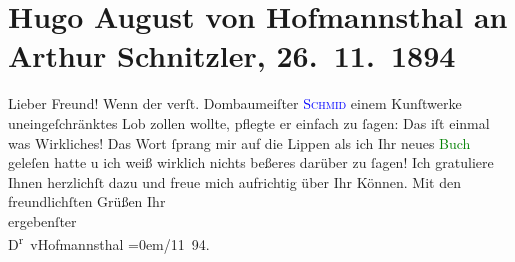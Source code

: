 

               \section[Hugo August von Hofmannsthal an Arthur Schnitzler, 26. 11. 1894]{ Hugo August von Hofmannsthal an Arthur Schnitzler,
                    26. 11. 1894}\nopagebreak{}\rehead{ }\normalsize\beginnumbering{} \toendnotes[C]{\smallbreak\pagebreak[2]} 
\toendnotes[C]{\smallbreak}\pstart{}{\pb}Lieber Freund!\pend\pstart
           Wenn der verſt. Dombaumeiſter \textcolor{blue}{\textsc{Schmid}}{}\ledrightnote{\textcolor{blue}{Friedrich Schmidt}} einem Kunſtwerke uneingeſchränktes Lob zollen wollte, pflegte er einfach
                    zu ſagen: Das iſt einmal was Wirkliches! Das Wort ſprang mir auf die Lippen als
                    ich Ihr neues \textcolor{green}{Buch}{} geleſen
                    hatte u ich weiß wirklich nichts beßeres darüber zu ſagen! Ich gratuliere Ihnen
                    herzlichſt {\pb}dazu und freue mich aufrichtig über
                    Ihr Können.\pend
           \pstart
           Mit den freundlichſten Grüßen Ihr{\\[\baselineskip]}ergebenſter{\\[\baselineskip]}\spacefill\mbox{D\textsuperscript{r} vHofmannsthal}\pend
           \leftskip=0em{}/11 94.\pend
           \endnumbering{}  
      